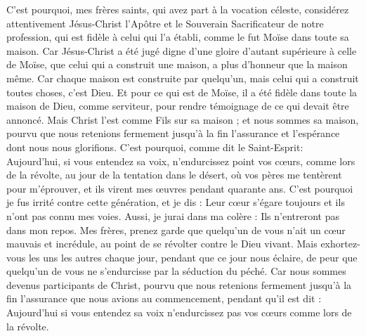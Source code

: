 \begin{multicols}{2}
\VerseOne{}C'est pourquoi, mes frères saints, qui avez part à la vocation céleste, considérez attentivement Jésus-Christ l'Apôtre et le Souverain Sacrificateur de notre profession,
qui est fidèle à celui qui l'a établi, comme le fut Moïse dans toute sa maison.
Car Jésus-Christ a été jugé digne d'une gloire d'autant supérieure à celle de Moïse, que celui qui a construit une maison, a plus d’honneur que la maison même.
Car chaque maison est construite par quelqu'un, mais celui qui a construit toutes choses, c'est Dieu.
Et pour ce qui est de Moïse, il a été fidèle dans toute la maison de Dieu, comme serviteur, pour rendre témoignage de ce qui devait être annoncé.
Mais Christ l’est comme Fils sur sa maison ; et nous sommes sa maison, pourvu que nous retenions fermement jusqu’à la fin l'assurance et l'espérance dont nous nous glorifions.
C'est pourquoi, comme dit le Saint-Esprit: Aujourd'hui, si vous entendez sa voix,
n'endurcissez point vos cœurs, comme lors de la révolte, au jour de la tentation dans le désert,
où vos pères me tentèrent pour m’éprouver, et ils virent mes œuvres pendant quarante ans.
C'est pourquoi je fus irrité contre cette génération, et je dis : Leur cœur s'égare toujours et ils n'ont pas connu mes voies.
Aussi, je jurai dans ma colère : Ils n’entreront pas dans mon repos.
Mes frères, prenez garde que quelqu'un de vous n’ait un cœur mauvais et incrédule, au point de se révolter contre le Dieu vivant.
Mais exhortez-vous les uns les autres chaque jour, pendant que ce jour nous éclaire, de peur que quelqu'un de vous ne s'endurcisse par la séduction du péché.
Car nous sommes devenus participants de Christ, pourvu que nous retenions fermement jusqu'à la fin l’assurance que nous avions au commencement,
pendant qu'il est dit : Aujourd'hui si vous entendez sa voix n'endurcissez pas vos cœurs comme lors de la révolte.

\end{multicols}
